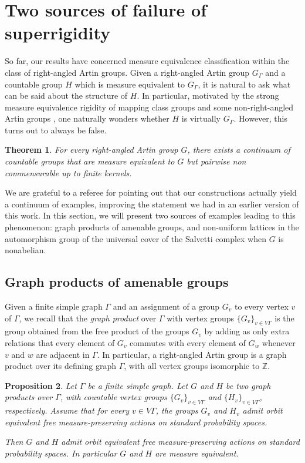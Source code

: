 \documentclass[11pt]{article}
\numberwithin{equation}{section}
\theoremstyle{plain}
\newtheorem{theo}{Theorem}[section]
\newtheorem{prop}[theo]{Proposition}
\theoremstyle{definition}
\begin{document}
\section{Two sources of failure of superrigidity}

So far, our results have concerned measure equivalence classification within the class of right-angled Artin groups. Given a right-angled Artin group $G_\Gamma$ and a countable group $H$ which is measure equivalent to $G_\Gamma$, it is natural to ask what can be said about the structure of $H$. In particular, motivated by the strong measure equivalence rigidity of mapping class groups \cite{Kid} and some non-right-angled Artin groups \cite{HH}, one naturally wonders whether $H$ is virtually $G_\Gamma$. However, this turns out to always be false.

\begin{theo}\label{theo:non-rigidity}
For every right-angled Artin group $G$, there exists a continuum of countable groups that are measure equivalent to $G$ but pairwise non commensurable up to finite kernels.
\end{theo}

We are grateful to a referee for pointing out that our constructions actually yield a continuum of examples, improving the statement we had in an earlier version of this work. In this section, we will present two sources of examples leading to this phenomenon: graph products of amenable groups, and non-uniform lattices in the automorphism group of the universal cover of the Salvetti complex when $G$ is nonabelian.

\subsection{Graph products of amenable groups}

Given a finite simple graph $\Gamma$ and an assignment of a group $G_v$ to every vertex $v$ of $\Gamma$, we recall that the \emph{graph product} over $\Gamma$ with vertex groups $\{G_v\}_{v\in V\Gamma}$ is the group obtained from the free product of the groups $G_v$ by adding as only extra relations that every element of $G_v$ commutes with every element of $G_w$ whenever $v$ and $w$ are adjacent in $\Gamma$. In particular, a right-angled Artin group is a graph product over its defining graph $\Gamma$, with all vertex groups isomorphic to $\mathbb{Z}$.

\begin{prop}\label{prop:graph-product}
Let $\Gamma$ be a finite simple graph. Let $G$ and $H$ be two graph products over $\Gamma$, with countable vertex groups $\{G_v\}_{v\in V\Gamma}$ and $\{H_v\}_{v\in V\Gamma}$, respectively. Assume that for every $v\in V\Gamma$, the groups $G_v$ and $H_v$ admit orbit equivalent free measure-preserving actions on standard probability spaces.

Then $G$ and $H$ admit orbit equivalent free measure-preserving actions on standard probability spaces. In particular $G$ and $H$ are measure equivalent.
\end{prop}
\end{document}
